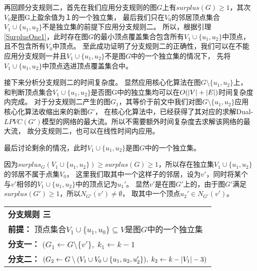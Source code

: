 再回顾分支规则二，首先在我们应用分支规则的图$G$上有$surplus(G) \ge 1$，其次$V_0$是图G上盈余值为１的一个独立集，
最后我们只在$V_0$的邻居顶点集合$V_1 \cup \{u_1, u_2\}$不是独立集的前提下应用分支规则二。
所以，根据引理\ref{SurplusOne1}，此时存在图$G$的最小顶点覆盖集合包含所有$V_1 \cup \{u_1, u_2\}$中顶点，且不包含所有$V_0$中顶点。
至此成功证明了分支规则二的正确性，我们可以在不能应用分支规则一并且$V_1 \cup \{u_1, u_2\}$不是图$G$中的一个独立集的情况下，
先将$V_1 \cup \{u_1, u_2\}$中顶点选进顶点覆盖集合中。

接下来分析分支规则二的时间复杂度。
显然应用核心化算法在图$G \setminus \{u_1, u_2\}$上，
和判断顶点集合$V_1 \cup \{u_1, u_2\}$是否图G中的独立集均可以在$O(\left\vert V \right\vert + \left\vert E \right\vert)$时间复杂度内完成。
对于分支规则二产生的图$G_1$，其等价于前文中我们对图$G \setminus \{u_1, u_2\}$应用核心化算法收缩出来的新图$G'$，
在核心化算法中，已经获得了其对应的求解Dual-$LPVC(G')$模型的网络的最大流。所以不需要额外时间复杂度去求解该网络的最大流，
故分支规则二，也可以在线性时间内应用。

最后讨论剩余的情况，此时$V_1 \cup \{u_1, u_2\}$是图$G$中的一个独立集。

因为$surplus_G(V_1 \cup \{u_1, u_2\}) \ge surplus(G) \ge 1$，所以存在独立集$V_1 \cup \{u_1, u_2\}$的邻居不属于点集$V_0$，
这里我们取其中一个这样子的邻居，设为$v'$，同时将某个与$v'$相邻的$V_1 \cup \{u_1, u_2\}$中的顶点记为$u_1'$。
显然$v'$是在图$G'$上的，由于图$G'$满足$surplus(G') \ge 1$，所以$N_{G'}(v') \neq \emptyset$，
取其中一个顶点$u_2' \in N_{G'}(v')$。\\

\begin{tabular}{ p{0.9\headwidth} }
  \hline
  \textbf{分支规则 三 }\\
  \textbf{前提：} 顶点集合$V_1 \cup \{u_1, u_0\}\subseteq V$是图$G$中的一个独立集 \\
  \textbf{分支一：} $(G_1 \leftarrow G \setminus \{v'\},\; k_1 \leftarrow k - 1$\\
  \textbf{分支二：} $(G_2 \leftarrow G \setminus (V_1\cup V_0  \cup \{u_1, u_2, u_2'\}) ,\; k_2 \leftarrow k - \left\vert V_1 \right\vert - 3)$\\
  \hline
\end{tabular} \vspace{0.5cm}

